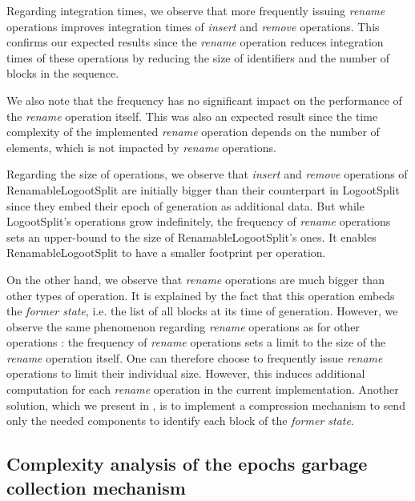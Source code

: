 \documentclass[10pt,journal,compsoc]{IEEEtran}
\newcommand{\ie}{i.e. }
\begin{document}
Regarding integration times, we observe that more frequently issuing \emph{rename} operations improves integration times of \emph{insert} and \emph{remove} operations.
This confirms our expected results since the \emph{rename} operation reduces integration times of these operations by reducing the size of identifiers and the number of blocks in the sequence.

We also note that the frequency has no significant impact on the performance of the \emph{rename} operation itself.
This was also an expected result since the time complexity of the implemented \emph{rename} operation depends on the number of elements, which is not impacted by \emph{rename} operations.

Regarding the size of operations, we observe that \emph{insert} and \emph{remove} operations of RenamableLogootSplit are initially bigger than their counterpart in LogootSplit since they embed their epoch of generation as additional data.
But while LogootSplit's operations grow indefinitely, the frequency of \emph{rename} operations sets an upper-bound to the size of RenamableLogootSplit's ones.
It enables RenamableLogootSplit to have a smaller footprint per operation.

On the other hand, we observe that \emph{rename} operations are much bigger than other types of operation.
It is explained by the fact that this operation embeds the \emph{former state}, \ie the list of all blocks at its time of generation.
However, we observe the same phenomenon regarding \emph{rename} operations as for other operations : the frequency of \emph{rename} operations sets a limit to the size of the \emph{rename} operation itself.
One can therefore choose to frequently issue \emph{rename} operations to limit their individual size.
However, this induces additional computation for each \emph{rename} operation in the current implementation.
Another solution, which we present in , is to implement a compression mechanism to send only the needed components to identify each block of the \emph{former state}.

\subsection{Complexity analysis of the epochs garbage collection mechanism}

\end{document}
